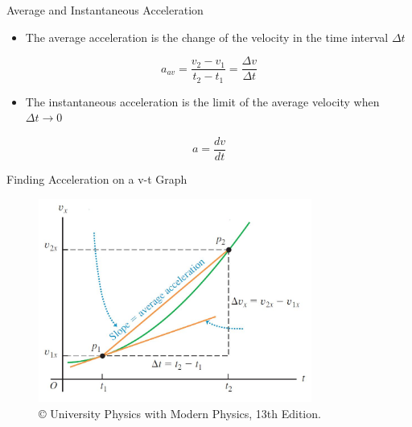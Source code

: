 \documentclass[]{beamer}
\begin{document}
\begin{frame}

Average and Instantaneous Acceleration
\vspace{3mm}

\begin{itemize}  
\item The average acceleration is the change of the velocity in the time interval $\Delta t$
\end{itemize}

\pause
\begin{equation}
a_{av}=\frac{v_2-v_1}{t_2-t_1}=\frac{\Delta v}{\Delta t}
\end{equation}  
\pause


\begin{itemize}  
\item The instantaneous acceleration is the limit of the average velocity when $\Delta t \rightarrow 0$
\end{itemize}
\pause

\begin{equation}
a=\frac{d v}{d t}
\end{equation}

 \end{frame}







\begin{frame}

Finding Acceleration on a v-t Graph 
\vspace{3mm}

  \begin{figure}[h!]   
   \includegraphics[width=0.8\textwidth]{images/12.jpg}
   \caption{ {\tiny © University Physics 
   with Modern Physics, 13th Edition.} }
\end{figure}

 \end{frame}
\end{document}
